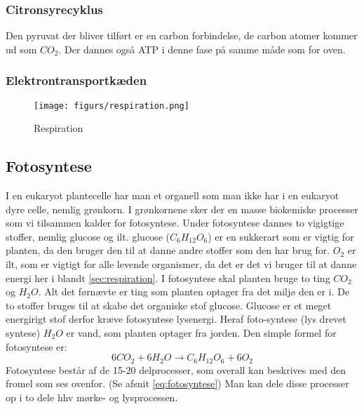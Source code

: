             \subsubsection*{Citronsyrecyklus}
                Den pyruvat der bliver tilført er en carbon forbindelse, de carbon atomer kommer ud som \begin{math}CO_2\end{math}. Der dannes også ATP i denne fase på samme måde som for oven.

            \subsubsection*{Elektrontransportkæden}
                \begin{figure}
                    \centering
                    \texttt{[image: figurs/respiration.png]}
                    \caption{Respiration}
                    \label{fig:respiration}
                \end{figure}
                \newpage
                
        \subsection*{Fotosyntese}
            I en eukaryot plantecelle har man et organell som man ikke har i en eukaryot dyre celle, nemlig grønkorn. I grønkornene sker der en masse biokemiske processer som vi tilsammen kalder for fotosyntese. Under fotosyntese dannes to vigigtige stoffer, nemlig glucose og ilt. glucose (\begin{math}C_6H_{12}O_6\end{math}) er en sukkerart som er vigtig for planten, da den bruger den til at danne andre stoffer som den har brug for. 
            \begin{math}O_2\end{math} er ilt, som er vigtigt for alle levende organismer, da det er det vi bruger til at danne energi her i blandt \ref{sec:respiration}.
            I fotosyntese skal planten bruge to ting \begin{math}CO_2\end{math} og \begin{math}H_2O\end{math}. Alt det førnævte er ting som planten optager fra det miljø den er i. De to stoffer bruges til at skabe det organiske stof glucose. Glucose er et meget energirigt stof derfor kræve fotosyntese lysenergi. Heraf foto-syntese (lys drevet syntese)  \begin{math}H_2O\end{math} er vand, som planten optager fra jorden.
            Den simple formel for fotosyntese er: \begin{equation} 6CO_2 + 6H_2O \rightarrow C_6H_{12}O_6 + 6O_2 \end{equation}\label{eq:fotosyntese}
            Fotosyntese består af de 15-20 delprocesser, som overall kan beskrives med den fromel som ses ovenfor. (Se afsnit \ref{eq:fotosyntese})
            Man kan dele disse processer op i to dele hhv mørke- og lysprocessen. \newline 
